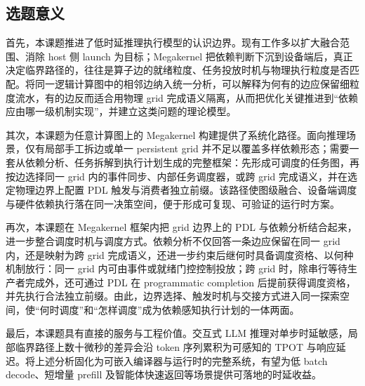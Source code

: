 \subsection{选题意义}

首先，本课题推进了低时延推理执行模型的认识边界。现有工作多以扩大融合范围、消除 host 侧 launch 为目标；Megakernel 把依赖判断下沉到设备端后，真正决定临界路径的，往往是算子边的就绪粒度、任务投放时机与物理执行粒度是否匹配。将同一逻辑计算图中的相邻边纳入统一分析，可以解释为何有的边应保留细粒度流水，有的边反而适合用物理 grid 完成语义隔离，从而把优化关键推进到“依赖应由哪一级机制实现”，并建立这类问题的理论模型。

其次，本课题为任意计算图上的 Megakernel 构建提供了系统化路径。面向推理场景，仅有局部手工拆边或单一 persistent grid 并不足以覆盖多样依赖形态；需要一套从依赖分析、任务拆解到执行计划生成的完整框架：先形成可调度的任务图，再按边选择同一 grid 内的事件同步、内部任务调度器，或跨 grid 完成语义，并在选定物理边界上配置 PDL 触发与消费者独立前缀。该路径使图级融合、设备端调度与硬件依赖执行落在同一决策空间，便于形成可复现、可验证的运行时方案。

再次，本课题在 Megakernel 框架内把 grid 边界上的 PDL 与依赖分析结合起来，进一步整合调度时机与调度方式。依赖分析不仅回答一条边应保留在同一 grid 内，还是映射为跨 grid 完成语义，还进一步约束后继何时具备调度资格、以何种机制放行：同一 grid 内可由事件或就绪门控控制投放；跨 grid 时，除串行等待生产者完成外，还可通过 PDL 在 programmatic completion 后提前获得调度资格，并先执行合法独立前缀\cite{nvidia2026pdl,nvidia2026cutlassDependentLaunch}。由此，边界选择、触发时机与交接方式进入同一探索空间，使“何时调度”和“怎样调度”成为依赖感知执行计划的一体两面。

最后，本课题具有直接的服务与工程价值。交互式 LLM 推理对单步时延敏感，局部临界路径上数十微秒的差异会沿 token 序列累积为可感知的 TPOT 与响应延迟。将上述分析固化为可嵌入编译器与运行时的完整系统，有望为低 batch decode、短增量 prefill 及智能体快速返回等场景提供可落地的时延收益。
